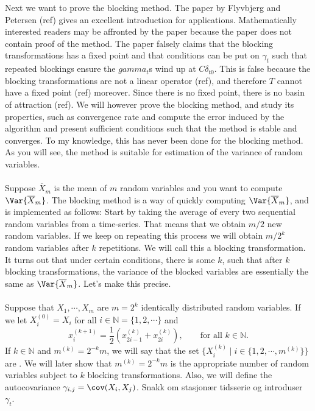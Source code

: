 \documentclass[11pt,english,a4paper]{article}
\begin{document}
Next we want to prove the blocking method. The paper by Flyvbjerg and Petersen (ref) gives an excellent introduction for applications. Mathematically interested readers may be affronted by the paper because the paper does not contain proof of the method. The paper falsely claims that the blocking transformations has a fixed point and that conditions can be put on $\gamma_t$ such that repeated blockings ensure the $gamma_t$s wind up at $C\delta_{t0}$. This is false because the blocking transformations are not a linear operator (ref), and therefore $T$ cannot have a fixed point (ref) moreover. Since there is no fixed point, there is no basin of attraction (ref). We will however prove the blocking method, and study its properties, such as convergence rate and compute the error induced by the algorithm and present sufficient conditions such that the method is stable and converges. To my knowledge, this has never been done for the blocking method. As you will see, the method is suitable for estimation of the variance of random variables.
\\
\\
Suppose $\overline X_m$ is the mean of $m$ random variables and you want to compute $\Var{\overline X_m}$. The blocking method is a way of quickly computing $\Var{\overline X_m}$, and is implemented as follows: Start by taking the average of every two sequential random variables from a time-series. That means that we obtain $m/2$ new random variables. If we keep on repeating this process we will obtain $m/2^k$ random variables after $k$ repetitions. We will call this a blocking transformation. It turns out that under certain conditions, there is some $k$, such that after $k$ blocking transformations, the variance of the blocked variables are essentially the same as $\Var{\overline X_m}$. Let's make this precise.\\
\\
Suppose that $X_1, \cdots, X_m$ are $m = 2^k$ identically distributed random variables. If we let $X^{(0)}_i = X_i$ for all $i \in \mathbb{N} = \{1,2,\cdots\}$ and
\[
x_i^{(k+1)} = \frac{1}{2} \left( x_{2i-1}^{(k)} + x_{2i}^{(k)} \right), \qquad \text{for all $k \in \mathbb{N}$}.
\]
If $k \in \mathbb{N}$ and $m^{(k)} = 2^{-k}m$, we will say that the set $\{X^{(k)}_i \;|\; i \in \{1,2,\cdots, m^{(k)}\}\}$ are . We will later show that $m^{(k)} = 2^{-k}m$ is the appropriate number of random variables subject to $k$ blocking transformations. Also, we will define the autocovariance $\gamma_{i,j} = \cov (X_i,X_j)$. Snakk om stasjonær tidsserie og introduser $\gamma_t$.
\end{document}
